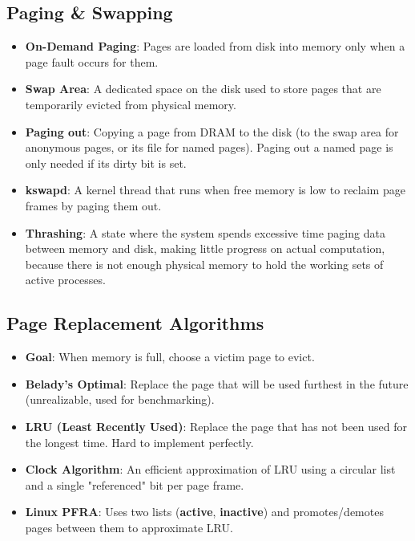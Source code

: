 \documentclass[8pt,a4paper]{article}
\begin{document}
\begin{multicols}{2}
\subsection*{Paging \& Swapping}
\begin{itemize}
    \item \textbf{On-Demand Paging}: Pages are loaded from disk into memory only when a page fault occurs for them.
    \item \textbf{Swap Area}: A dedicated space on the disk used to store pages that are temporarily evicted from physical memory.
    \item \textbf{Paging out}: Copying a page from DRAM to the disk (to the swap area for anonymous pages, or its file for named pages). Paging out a named page is only needed if its dirty bit is set.
    \item \textbf{kswapd}: A kernel thread that runs when free memory is low to reclaim page frames by paging them out.
    \item \textbf{Thrashing}: A state where the system spends excessive time paging data between memory and disk, making little progress on actual computation, because there is not enough physical memory to hold the working sets of active processes.
\end{itemize}

\subsection*{Page Replacement Algorithms}
\begin{itemize}
    \item \textbf{Goal}: When memory is full, choose a victim page to evict.
    \item \textbf{Belady's Optimal}: Replace the page that will be used furthest in the future (unrealizable, used for benchmarking).
    \item \textbf{LRU (Least Recently Used)}: Replace the page that has not been used for the longest time. Hard to implement perfectly.
    \item \textbf{Clock Algorithm}: An efficient approximation of LRU using a circular list and a single "referenced" bit per page frame.
    \item \textbf{Linux PFRA}: Uses two lists (\textbf{active}, \textbf{inactive}) and promotes/demotes pages between them to approximate LRU.
\end{itemize}


\end{multicols}
\end{document}
